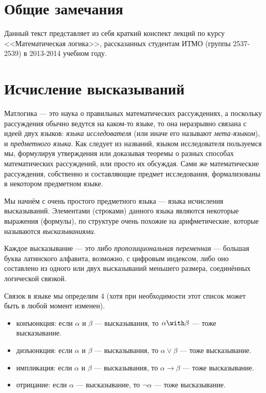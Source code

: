 \section{Общие замечания}

Данный текст представляет из себя краткий конспект лекций по курсу
<<Математическая логика>>, рассказанных студентам ИТМО (группы 2537-2539)
в 2013-2014 учебном году.

\section{Исчисление высказываний}

Матлогика --- это наука о правильных математических рассуждениях, а поскольку
рассуждения обычно ведутся на каком-то языке, то она неразрывно связана с идеей
двух языков: \emph{языка исследователя} (или иначе его называют \emph{мета-языком}),
и \emph{предметного языка}. Как следует из названий, языком исследователя 
пользуемся мы, формулируя утверждения или доказывая теоремы о разных способах
математических рассуждений, или просто их обсуждая. Сами же математические рассуждения,
собственно и составляющие предмет исследования, формализованы в некотором предметном 
языке.

Мы начнём с очень простого предметного языка --- языка исчисления высказываний.
Элементами (строками) данного языка являются некоторые выражения (формулы), по структуре
очень похожие на арифметические, которые называются \emph{высказываниями}.

Каждое высказывание --- это либо \emph{пропозициональная переменная} --- 
большая буква латинского алфавита, возможно, с цифровым индексом, либо 
оно составлено из одного или двух высказываний меньшего размера, соединённых логической связкой.

Связок в языке мы определим 4 (хотя при необходимости этот список может быть
в любой момент изменен).
\begin{itemize}
\item конъюнкция: если $\alpha$ и $\beta$ --- высказывания, то $\alpha \with \beta$ --- тоже высказывание.
\item дизъюнкция: если $\alpha$ и $\beta$ --- высказывания, то $\alpha \vee \beta$ --- тоже высказывание.
\item импликация: если $\alpha$ и $\beta$ --- высказывания, то $\alpha \rightarrow \beta$ --- тоже высказывание.
\item отрицание: если $\alpha$ --- высказывание, то $\neg\alpha$ --- тоже высказывание.
\end{itemize}

